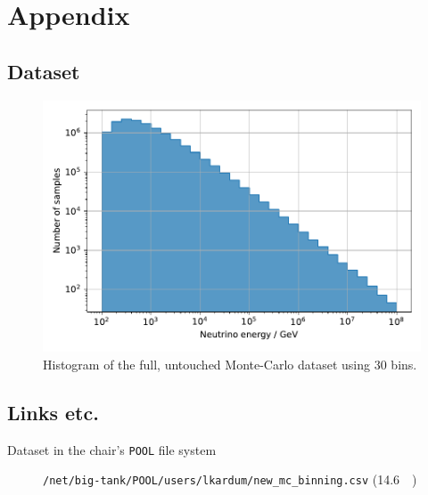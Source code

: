 \chapter{Appendix}
\blindtext

\section{Dataset}
\begin{figure}
    \centering
    \includegraphics[scale=1]{content/plots/dataset:raw:histogram.pdf}
    \caption{Histogram of the full, untouched Monte-Carlo dataset using 30 bins.}
    \label{fig:dataset:raw:histogram}
\end{figure}

\section{Links etc.}
\begin{description}
    \item[Dataset in the chair's \texttt{POOL} file system] \texttt{/net/big-tank/POOL/users/lkardum/new\_mc\_binning.csv} (\SI{14.6}{\giga\byte})
\end{description}
